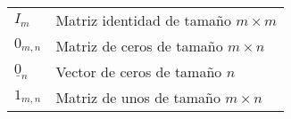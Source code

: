 \begin{table}[ht!]
\begin{center}
\begin{tabularx}{\textwidth}{|l|X|}
            $I_{m}$                                                                                                              & Matriz identidad de tamaño $ m \times m$                                                                                                                                    \\
            $0_{m,n}$                                                                                                            & Matriz de ceros de tamaño $ m \times n$                                                                                                                                     \\
            $\underline{0}_{n}$                                                                                                  & Vector de ceros de tamaño $n$                                                                                                                                               \\
            $1_{m,n}$                                                                                                            & Matriz de unos de tamaño $ m \times n$                                                                                                                                      \\

\end{tabularx}
\end{center}
\end{table}
